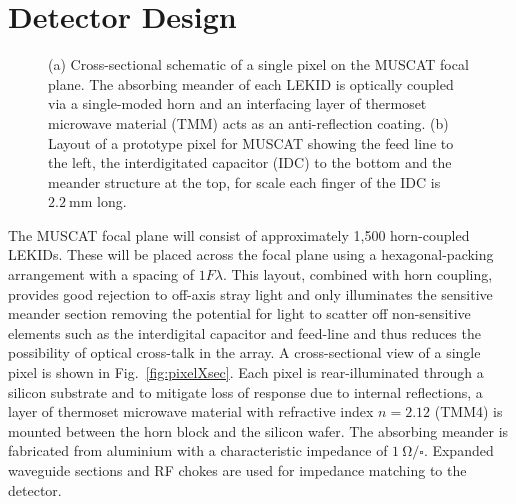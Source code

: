 \documentclass{spie}
\begin{document}
\section{Detector Design}
\begin{figure}[tb]
\centering
{}
\hspace{0.1\textwidth}
\hspace{0.1\textwidth}
\caption{(a) Cross-sectional schematic of a single pixel on the MUSCAT focal plane. The absorbing meander of each LEKID is optically coupled via a single-moded horn and an interfacing layer of thermoset microwave material (TMM) acts as an anti-reflection coating. (b) Layout of a prototype pixel for MUSCAT showing the feed line to the left, the interdigitated capacitor (IDC) to the bottom and the meander structure at the top, for scale each finger of the IDC is $2.2~\si{\milli\metre}$ long.}\label{fig:pixelDesign}
\end{figure}
The MUSCAT focal plane will consist of approximately 1,500 horn-coupled LEKIDs. These will be placed across the focal plane using a hexagonal-packing arrangement with a spacing of $1F\lambda$. This layout, combined with horn coupling, provides good rejection to off-axis stray light and only illuminates the sensitive meander section removing the potential for light to scatter off non-sensitive elements such as the interdigital capacitor and feed-line and thus reduces the possibility of optical cross-talk in the array. A cross-sectional view of a single pixel is shown in Fig.~\ref{fig:pixelXsec}. Each pixel is rear-illuminated through a silicon substrate and to mitigate loss of response due to internal reflections, a layer of thermoset microwave material with refractive index $n=2.12$ (TMM4) is mounted between the horn block and the silicon wafer. The absorbing meander is fabricated from aluminium with a characteristic impedance of $1~\si{\ohm}/\square$. Expanded waveguide sections and RF chokes are used for impedance matching to the detector.
\end{document}
